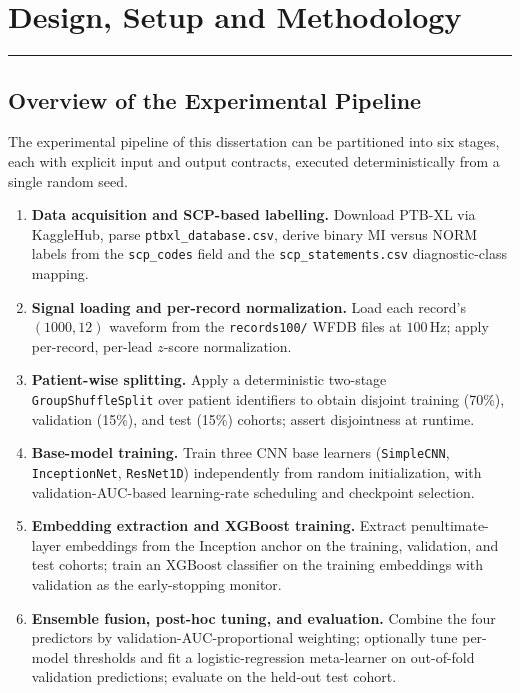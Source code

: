 \chapter{Design, Setup and Methodology}
\label{chapter:methodology}
\noindent\rule{\linewidth}{2pt}

\section{Overview of the Experimental Pipeline}

The experimental pipeline of this dissertation can be partitioned into six stages, each with explicit input and output contracts, executed deterministically from a single random seed.

\begin{enumerate}[leftmargin=*]
\item \textbf{Data acquisition and SCP-based labelling.} Download PTB-XL via KaggleHub, parse \texttt{ptbxl\_database.csv}, derive binary MI versus NORM labels from the \texttt{scp\_codes} field and the \texttt{scp\_statements.csv} diagnostic-class mapping.
\item \textbf{Signal loading and per-record normalization.} Load each record's $(1000, 12)$ waveform from the \texttt{records100/} WFDB files at $100$\,Hz; apply per-record, per-lead $z$-score normalization.
\item \textbf{Patient-wise splitting.} Apply a deterministic two-stage \texttt{GroupShuffleSplit} over patient identifiers to obtain disjoint training (70\%), validation (15\%), and test (15\%) cohorts; assert disjointness at runtime.
\item \textbf{Base-model training.} Train three CNN base learners (\texttt{SimpleCNN}, \texttt{InceptionNet}, \texttt{ResNet1D}) independently from random initialization, with validation-AUC-based learning-rate scheduling and checkpoint selection.
\item \textbf{Embedding extraction and XGBoost training.} Extract penultimate-layer embeddings from the Inception anchor on the training, validation, and test cohorts; train an XGBoost classifier on the training embeddings with validation as the early-stopping monitor.
\item \textbf{Ensemble fusion, post-hoc tuning, and evaluation.} Combine the four predictors by validation-AUC-proportional weighting; optionally tune per-model thresholds and fit a logistic-regression meta-learner on out-of-fold validation predictions; evaluate on the held-out test cohort.
\end{enumerate}

